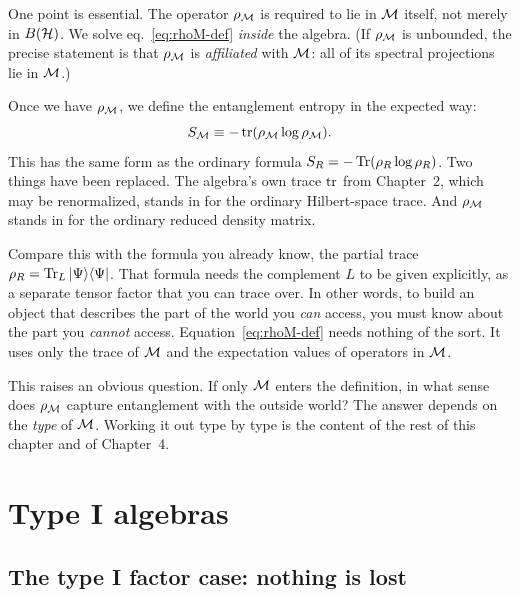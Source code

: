 One point is essential. The operator $\rho_{\mathcal{M}}$ is required to lie in $\mathcal{M}$ itself, not merely in $B(\mathcal{H})$. We
solve eq.~\eqref{eq:rhoM-def} \emph{inside} the algebra. (If $\rho_{\mathcal{M}}$ is unbounded, the precise statement is
that $\rho_{\mathcal{M}}$ is \emph{affiliated} with $\mathcal{M}$: all of its spectral projections lie in $\mathcal{M}$.)

Once we have $\rho_{\mathcal{M}}$, we define the entanglement entropy in the expected way:
\begin{equation}
S_{\mathcal{M}} \equiv -\operatorname{tr}(\rho_{\mathcal{M}}\log\rho_{\mathcal{M}}) .
\label{eq:SM-def}
\end{equation}
This has the same form as the ordinary formula $S_R=-\operatorname{Tr}(\rho_R\log\rho_R)$. Two things have been replaced.
The algebra's own trace $\operatorname{tr}$ from Chapter~2, which may be renormalized, stands in for the ordinary
Hilbert-space trace. And $\rho_{\mathcal{M}}$ stands in for the ordinary reduced density matrix.

Compare this with the formula you already know, the partial trace $\rho_R=\operatorname{Tr}_L\ket\Psi\!\bra\Psi$. That formula
needs the complement $L$ to be given explicitly, as a separate tensor factor that you can trace over. In other
words, to build an object that describes the part of the world you \emph{can} access, you must know about the
part you \emph{cannot} access. Equation~\eqref{eq:rhoM-def} needs nothing of the sort. It uses only the trace of
$\mathcal{M}$ and the expectation values of operators in $\mathcal{M}$.

This raises an obvious question. If only $\mathcal{M}$ enters the definition, in what sense does $\rho_{\mathcal{M}}$ capture
entanglement with the outside world? The answer depends on the \emph{type} of $\mathcal{M}$. Working it out type by type
is the content of the rest of this chapter and of Chapter~4.

\section{Type I algebras}

\subsection*{The type I factor case: nothing is lost}

